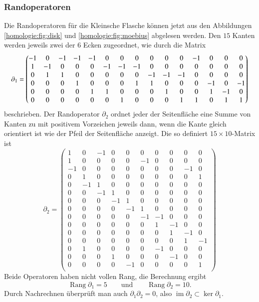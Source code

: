\subsubsection{Randoperatoren}
Die Randoperatoren für die Kleinsche Flasche können jetzt aus
den Abbildungen \ref{homologie:fig:disk} und \ref{homologie:fig:moebius}
abgelesen werden.
Den $15$ Kanten werden jeweils zwei der $6$ Ecken zugeordnet, wie
durch die Matrix
\[
\setcounter{MaxMatrixCols}{15}
\partial_1
=
\begin{pmatrix}
-1& 0&-1&-1&-1& 0& 0& 0& 0& 0& 0&-1& 0& 0& 0\\
 1&-1& 0& 0& 0&-1&-1&-1& 0& 0& 0& 0& 0& 0& 0\\
 0& 1& 1& 0& 0& 0& 0& 0&-1&-1&-1& 0& 0& 0& 0\\
 0& 0& 0& 1& 0& 0& 0& 1& 1& 0& 0& 0&-1& 0&-1\\
 0& 0& 0& 0& 1& 1& 0& 0& 0& 1& 0& 0& 1&-1& 0\\
 0& 0& 0& 0& 0& 0& 1& 0& 0& 0& 1& 1& 0& 1& 1
\end{pmatrix}
\]
beschrieben.
Der Randoperator $\partial_2$ ordnet jeder der Seitenfläche eine Summe
von Kanten zu mit positivem Vorzeichen jeweils dann, wenn die Kante gleich
orientiert ist wie der Pfeil der Seitenfläche anzeigt.
Die so definiert $15\times 10$-Matrix ist
\[
\partial_2
=
\begin{pmatrix}
 1& 0&-1& 0& 0& 0& 0& 0& 0& 0	\\ %
 1& 0& 0& 0& 0&-1& 0& 0& 0& 0	\\ %
-1& 0& 0& 0& 0& 0& 0& 0&-1& 0	\\ %
 0& 1& 0& 0& 0& 0& 0& 0& 0& 1	\\ %
 0&-1& 1& 0& 0& 0& 0& 0& 0& 0	\\ %
 0& 0&-1& 1& 0& 0& 0& 0& 0& 0	\\ %
 0& 0& 0&-1& 1& 0& 0& 0& 0& 0	\\ %
 0& 0& 0& 0&-1& 1& 0& 0& 0& 0	\\ %
 0& 0& 0& 0& 0&-1&-1& 0& 0& 0	\\ %
 0& 0& 0& 0& 0& 0& 1&-1& 0& 0	\\ %
 0& 0& 0& 0& 0& 0& 0& 1&-1& 0	\\ %
 0& 0& 0& 0& 0& 0& 0& 0& 1&-1	\\ %
 0& 1& 0& 0& 0& 0&-1& 0& 0& 0	\\ %
 0& 0& 0& 1& 0& 0& 0&-1& 0& 0	\\ %
 0& 0& 0& 0&-1& 0& 0& 0& 0& 1	\\ %
\end{pmatrix}
\]
Beide Operatoren haben nicht vollen Rang, die Berechnung ergibt
\[
\operatorname{Rang}\partial_1 = 5
\qquad\text{und}\qquad
\operatorname{Rang}\partial_2 = 10.
\]
Durch Nachrechnen überprüft man auch $\partial_1\partial_2=0$, also
$\operatorname{im}\partial_2\subset \operatorname{ker}\partial_1$.

